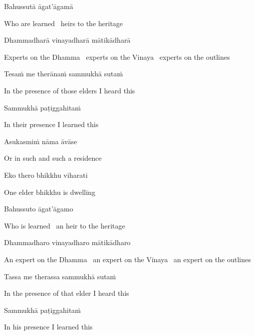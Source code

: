 Bahussutā āgat'āgamā

\begin{english}
  Who are learned \breathmark\ heirs to the heritage
\end{english}

Dhammadharā vinayadharā mātikādharā

\begin{english-hang}
  Experts on the Dhamma \breathmark\ experts on the Vinaya \breathmark\ experts on the outlines
\end{english-hang}

Tesaṁ me therānaṁ sammukhā sutaṁ

\begin{english}
  In the presence of those elders I heard this
\end{english}

Sammukhā paṭiggahitaṁ

\begin{english}
  In their presence I learned this
\end{english}

Asukasmiṁ nāma āvāse

\begin{english}
  Or in such and such a residence
\end{english}

Eko thero bhikkhu viharati

\begin{english}
  One elder bhikkhu is dwelling
\end{english}

Bahussuto āgat'āgamo

\begin{english}
  Who is learned \breathmark\ an heir to the heritage
\end{english}

Dhammadharo vinayadharo mātikādharo

\begin{english-hang}
  An expert on the Dhamma \breathmark\ an expert on the Vinaya \breathmark\ an expert on the outlines
\end{english-hang}

Tassa me therassa sammukhā sutaṁ

\begin{english}
  In the presence of that elder I heard this
\end{english}

Sammukhā paṭiggahitaṁ

\begin{english}
  In his presence I learned this
\end{english}

